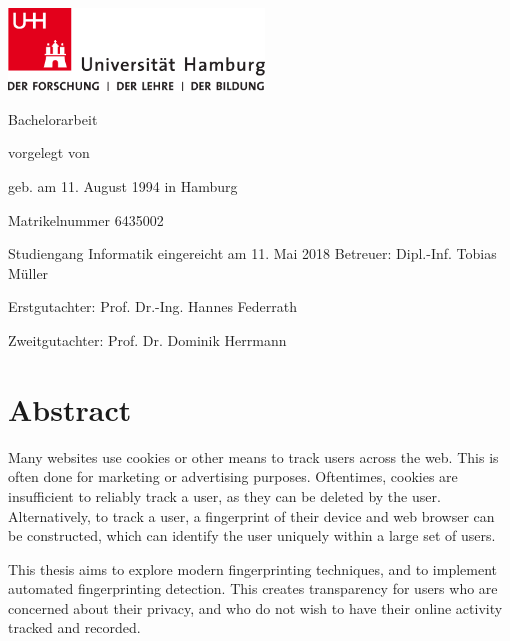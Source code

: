 \documentclass[
    fontsize=12pt,
    headings=small,
    parskip=half,
    bibliography=totoc,
    numbers=noenddot,
    open=any
    ]{scrreprt}
\begin{document}
\newpage
\thispagestyle{empty}
\begin{titlepage}%
\includegraphics[width=6.8cm]{images/up-uhh-logo-u-2010-u-farbe-u-rgb.pdf}
\begin{center}\Large
	\vfill
	Bachelorarbeit
	\vfill
	\makeatletter
	{\Large\textsf{\textbf{\@title}}\par}
	\makeatother
	\vfill
	vorgelegt von
	\par\bigskip
	\makeatletter
	{\@author} \par
	\makeatother
	geb. am 11. August 1994 in Hamburg \par
	Matrikelnummer 6435002 \par
	Studiengang Informatik
	\vfill
	\makeatletter
	eingereicht am 11. Mai 2018
	\makeatother
	\vfill
	Betreuer: Dipl.-Inf. Tobias Müller \par
	Erstgutachter: Prof. Dr.-Ing. Hannes Federrath \par
	Zweitgutachter: Prof. Dr. Dominik Herrmann
\end{center}
\end{titlepage}%

\null\newpage

\chapter*{Abstract}

Many websites use cookies or other means to track users across the web. This is often
done for marketing or advertising purposes. Oftentimes, cookies are insufficient to reliably
track a user, as they can be deleted by the user. Alternatively, to track a user, a fingerprint
of their device and web browser can be constructed, which can identify the user uniquely
within a large set of users.

This thesis aims to explore modern fingerprinting techniques, and to implement
automated fingerprinting detection. This creates transparency for users
who are concerned about their privacy, and who do not wish to have their online
activity tracked and recorded.
\end{document}
